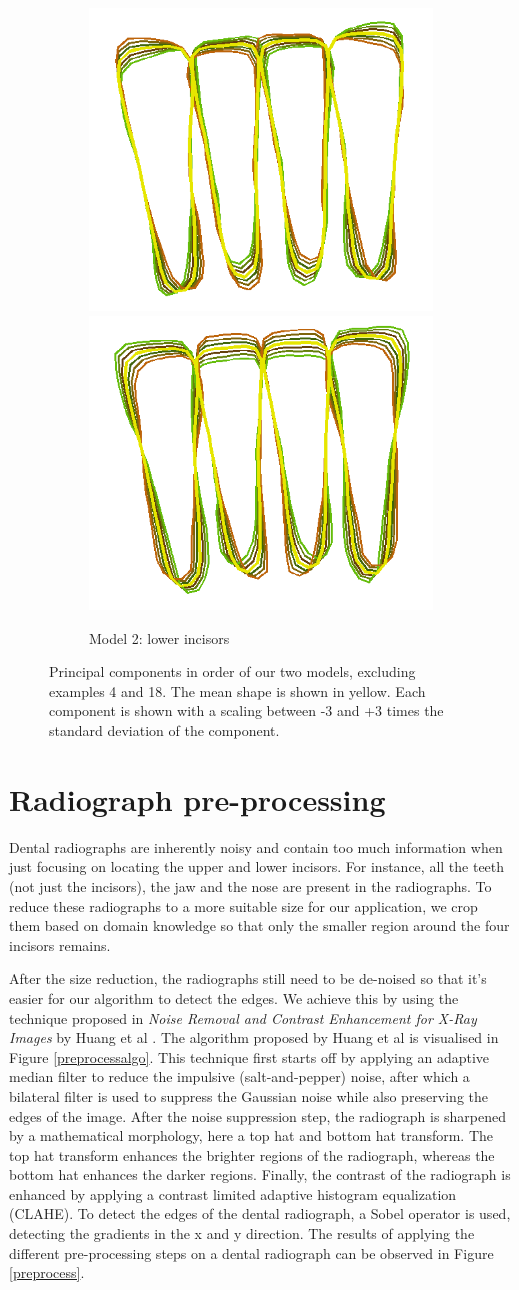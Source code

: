 \documentclass[a4paper,titlepage,12pt]{article}
\begin{document}
\begin{figure}
\begin{subfigure}{\linewidth}
		\includegraphics[width=0.19\linewidth]{shape/low_pca4}
		\includegraphics[width=0.19\linewidth]{shape/low_pca5}
		\caption{Model 2: lower incisors}
	\end{subfigure}
	\caption{Principal components in order of our two models, excluding examples 4 and 18. The mean shape is shown in yellow. Each component is shown with a scaling between -3 and +3 times the standard deviation of the component. }
	\label{fig:align}
\end{figure}

\section{Radiograph pre-processing}

Dental radiographs are inherently noisy and contain too much information when just focusing on locating the upper and lower incisors.
For instance, all the teeth (not just the incisors), the jaw and the nose are present in the radiographs.
To reduce these radiographs to a more suitable size for our application, we crop them based on domain knowledge so that only the smaller region around the four incisors remains.

After the size reduction, the radiographs still need to be de-noised so that it's easier for our algorithm to detect the edges.
We achieve this by using the technique proposed in \textit{Noise Removal and Contrast Enhancement for X-Ray Images} by Huang et al \cite{JBEMI1893}.
The algorithm proposed by Huang et al is visualised in Figure \ref{preprocessalgo}. This technique first starts off by applying an adaptive median filter to reduce the impulsive (salt-and-pepper) noise, after which a bilateral filter is used to suppress the Gaussian noise while also preserving the edges of the image.
After the noise suppression step, the radiograph is sharpened by a mathematical morphology, here a top hat and bottom hat transform.
The top hat transform enhances the brighter regions of the radiograph, whereas the bottom hat enhances the darker regions.
Finally, the contrast of the radiograph is enhanced by applying a contrast limited adaptive histogram equalization (CLAHE).
To detect the edges of the dental radiograph, a Sobel operator is used, detecting the gradients in the x and y direction.
The results of applying the different pre-processing steps on a dental radiograph can be observed in Figure \ref{preprocess}. 
\end{document}
